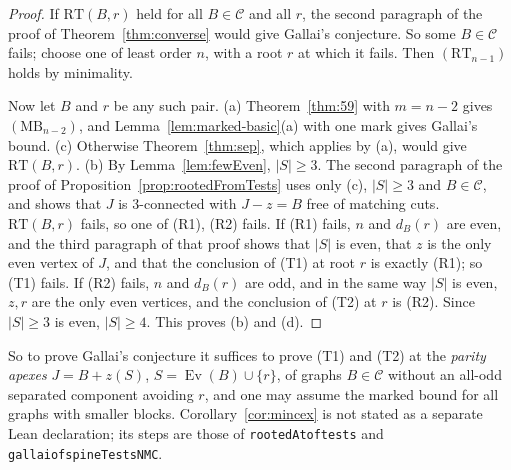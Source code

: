 \documentclass[11pt]{amsart}
\theoremstyle{definition}
\theoremstyle{remark}
\renewcommand{\_}{\oldunderscore\allowbreak}
\newcommand{\cC}{\mathcal{C}}
\newcommand{\MBU}{\mathrm{MB}}
\newcommand{\RT}{\mathrm{RT}}
\newcommand{\Ev}{\operatorname{Ev}}
\begin{document}
\begin{proof}
If $\RT(B,r)$ held for all $B\in\cC$ and all $r$, the second paragraph of the proof of
Theorem~\ref{thm:converse} would give Gallai's conjecture. So some $B\in\cC$ fails; choose one of
least order $n$, with a root $r$ at which it fails. Then $(\RT_{n-1})$ holds by minimality.

Now let $B$ and $r$ be any such pair. (a) Theorem~\ref{thm:59} with $m=n-2$ gives $(\MBU_{n-2})$,
and Lemma~\ref{lem:marked-basic}(a) with one mark gives Gallai's bound. (c) Otherwise
Theorem~\ref{thm:sep}, which applies by (a), would give $\RT(B,r)$. (b) By Lemma~\ref{lem:fewEven},
$|S|\ge3$. The second paragraph of the proof of Proposition~\ref{prop:rootedFromTests} uses only
(c), $|S|\ge3$ and $B\in\cC$, and shows that $J$ is $3$-connected with $J-z=B$ free of matching cuts. $\RT(B,r)$
fails, so one of (R1), (R2) fails. If (R1) fails, $n$ and $d_B(r)$ are even, and the third paragraph
of that proof shows that $|S|$ is even, that $z$ is the only even vertex of $J$, and that the
conclusion of (T1) at root $r$ is exactly (R1); so (T1) fails. If (R2) fails, $n$ and $d_B(r)$ are
odd, and in the same way $|S|$ is even, $z,r$ are the only even vertices, and the conclusion of
(T2) at $r$ is (R2). Since $|S|\ge3$ is even, $|S|\ge4$. This proves (b) and (d).
\end{proof}

So to prove Gallai's conjecture it suffices to prove (T1) and (T2) at the \emph{parity apexes}
$J=B+z(S)$, $S=\Ev(B)\cup\{r\}$, of graphs $B\in\cC$ without an all-odd separated component avoiding
$r$, and one may assume the marked bound for all graphs with smaller blocks. Corollary~\ref{cor:mincex}
is not stated as a separate Lean declaration; its steps are those of \texttt{rootedAt\_of\_tests}
and \texttt{gallai\_of\_spineTestsNMC}.
\end{document}
